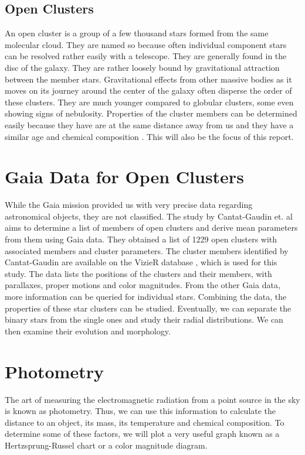 \subsection{Open Clusters}
An open cluster is a group of a few thousand stars formed from the same molecular cloud. They are named so because often individual component stars can be resolved rather easily with a telescope. They are generally found in the disc of the galaxy. They are rather loosely bound by gravitational attraction between the member stars. Gravitational effects from other massive bodies as it moves on its journey around the center of the galaxy often disperse the order of these clusters. They are much younger compared to globular clusters, some even showing signs of nebulosity. Properties of the cluster members can be determined easily because they have are at the same distance away from us and they have a similar age and chemical composition \citep{openclust}. This will also be the focus of this report.

\section{Gaia Data for Open Clusters}
While the Gaia mission provided us with very precise data regarding astronomical objects, they are not classified. The study by Cantat-Gaudin et. al \citep{cg} aims to determine a list of members of open clusters and derive mean parameters from them using Gaia data. They obtained a list of 1229 open clusters with associated members and cluster parameters. The cluster members identified by Cantat-Gaudin are available on the VizieR database \citep{vizier}, which is used for this study. The data lists the positions of the clusters and their members, with parallaxes, proper motions and color magnitudes. From the other Gaia data, more information can be queried for individual stars. Combining the data, the properties of these star clusters can be studied. Eventually, we can separate the binary stars from the single ones and study their radial distributions. We can then examine their evolution and morphology.

\section{Photometry}
The art of measuring the electromagnetic radiation from a point source in the sky is known as photometry. Thus, we can use this information to calculate the distance to an object, its mass, its temperature and chemical composition. To determine some of these factors, we will plot a very useful graph known as a Hertzsprung-Russel chart or a color magnitude diagram.

